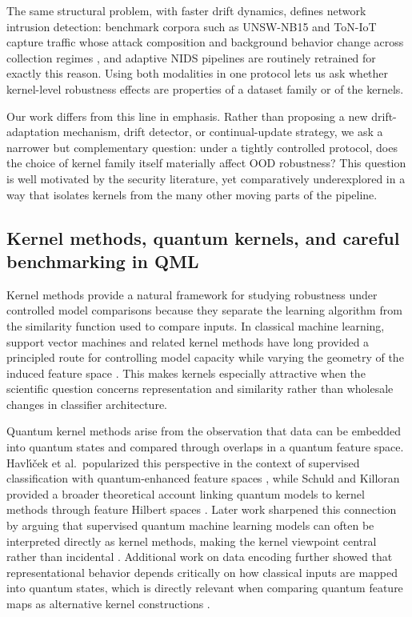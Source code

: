 \documentclass[journal]{IEEEtran}
\begin{document}
The same structural problem, with faster drift dynamics, defines network intrusion detection: benchmark corpora such as UNSW-NB15 and ToN-IoT capture traffic whose attack composition and background behavior change across collection regimes \cite{moustafa2015unsw,alsaedi2020toniot}, and adaptive NIDS pipelines are routinely retrained for exactly this reason. Using both modalities in one protocol lets us ask whether kernel-level robustness effects are properties of a dataset family or of the kernels.

Our work differs from this line in emphasis. Rather than proposing a new drift-adaptation mechanism, drift detector, or continual-update strategy, we ask a narrower but complementary question: under a tightly controlled protocol, does the choice of kernel family itself materially affect OOD robustness? This question is well motivated by the security literature, yet comparatively underexplored in a way that isolates kernels from the many other moving parts of the pipeline.

\subsection{Kernel methods, quantum kernels, and careful benchmarking in QML}

Kernel methods provide a natural framework for studying robustness under controlled model comparisons because they separate the learning algorithm from the similarity function used to compare inputs. In classical machine learning, support vector machines and related kernel methods have long provided a principled route for controlling model capacity while varying the geometry of the induced feature space \cite{cortes1995svm,scholkopf2002learningwithkernels}. This makes kernels especially attractive when the scientific question concerns representation and similarity rather than wholesale changes in classifier architecture.

Quantum kernel methods arise from the observation that data can be embedded into quantum states and compared through overlaps in a quantum feature space. Havl{\'\i}{\v{c}}ek et al.\ popularized this perspective in the context of supervised classification with quantum-enhanced feature spaces \cite{havlicek2019quantumenhanced}, while Schuld and Killoran provided a broader theoretical account linking quantum models to kernel methods through feature Hilbert spaces \cite{schuld2019featurehilbert}. Later work sharpened this connection by arguing that supervised quantum machine learning models can often be interpreted directly as kernel methods, making the kernel viewpoint central rather than incidental \cite{schuld2021kernelmethods}. Additional work on data encoding further showed that representational behavior depends critically on how classical inputs are mapped into quantum states, which is directly relevant when comparing quantum feature maps as alternative kernel constructions \cite{schuld2021encoding}.
\end{document}
